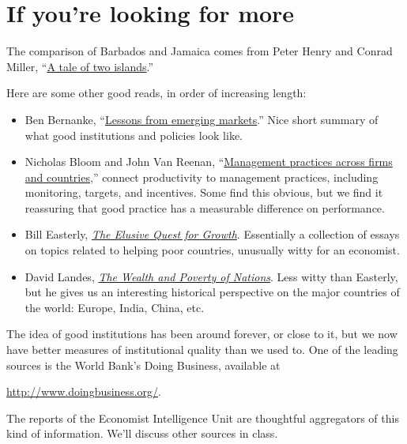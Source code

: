 \section*{If you're looking for more}

The comparison of Barbados and Jamaica comes from Peter Henry and Conrad Miller,
``\href{{http://www.aeaweb.org/articles.php?doi=10.1257/aer.99.2.261}}
{A tale of two islands}.''

Here are some other good reads, in order of increasing length:
\begin{itemize}
\item Ben Bernanke,
``\href{http://www.federalreserve.gov/newsevents/speech/bernanke20110928a.htm}
{Lessons from emerging markets}.''
Nice short summary of what good institutions and policies look like.

\item Nicholas Bloom and John Van Reenan,
``\href{http://www.aeaweb.org/articles.php?doi=10.1257/jep.24.1.203}
    {Management practices across firms and countries},''
connect productivity to management practices, including
monitoring, targets, and incentives.
Some find this obvious, but we find it reassuring that good practice has a measurable difference
on performance.

\item Bill Easterly,
\href{http://www.amazon.com/Elusive-Quest-Growth-Economists-Misadventures/dp/0262550423}
{\it The Elusive Quest for Growth}.
Essentially a collection of essays on topics related to helping poor countries,
unusually witty for an economist.

\item David Landes,
\href{http://www.amazon.com/Wealth-Poverty-Nations-Some-Rich/dp/0393318885}
{\it The Wealth and Poverty of Nations}.
Less witty than Easterly, but he gives us an interesting historical
perspective on the major countries of the world:  Europe, India, China, etc.
\end{itemize}

The idea of good institutions has been around forever, or close to it,
but we now have better measures of institutional quality than we used to.
One of the leading sources is the World Bank's Doing Business, available at

\vspace*{\parskip}
\centerline{\url{http://www.doingbusiness.org/}.}

The reports of the Economist Intelligence Unit are thoughtful aggregators
of this kind of information.
We'll discuss other sources in class.


